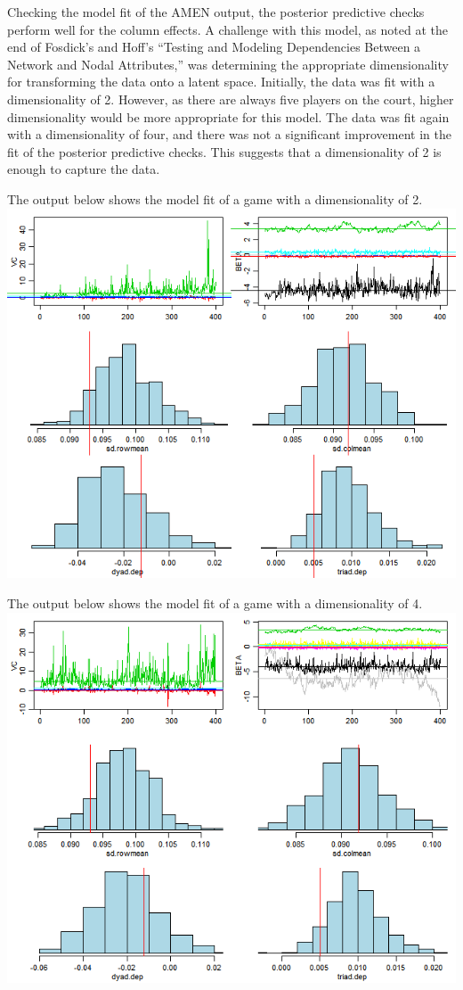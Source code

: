 \documentclass[12pt,twoside]{dukestatscithesis}
\theoremstyle{definition}
\theoremstyle{definition}
\theoremstyle{definition}
\theoremstyle{remark}
\begin{document}
Checking the model fit of the AMEN output, the posterior predictive
checks perform well for the column effects. A challenge with this model,
as noted at the end of Fosdick's and Hoff's ``Testing and Modeling
Dependencies Between a Network and Nodal Attributes,'' was determining
the appropriate dimensionality for transforming the data onto a latent
space. Initially, the data was fit with a dimensionality of 2. However,
as there are always five players on the court, higher dimensionality
would be more appropriate for this model. The data was fit again with a
dimensionality of four, and there was not a significant improvement in
the fit of the posterior predictive checks. This suggests that a
dimensionality of 2 is enough to capture the data.

The output below shows the model fit of a game with a dimensionality of
2. \includegraphics{img/amenoutput.png}

The output below shows the model fit of a game with a dimensionality of
4. \includegraphics{img/amenoutput4.png}
\end{document}
